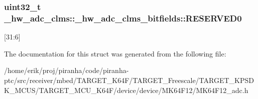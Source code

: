 \subsubsection[{\texorpdfstring{R\+E\+S\+E\+R\+V\+E\+D0}{RESERVED0}}]{\setlength{\rightskip}{0pt plus 5cm}uint32\+\_\+t \+\_\+hw\+\_\+adc\+\_\+clms\+::\+\_\+hw\+\_\+adc\+\_\+clms\+\_\+bitfields\+::\+R\+E\+S\+E\+R\+V\+E\+D0}\hypertarget{struct__hw__adc__clms_1_1__hw__adc__clms__bitfields_a57bd858771503ebb39e9ba968a82676d}{}\label{struct__hw__adc__clms_1_1__hw__adc__clms__bitfields_a57bd858771503ebb39e9ba968a82676d}
\mbox{[}31\+:6\mbox{]} 

The documentation for this struct was generated from the following file\+:\begin{DoxyCompactItemize}
\item 
/home/erik/proj/piranha/code/piranha-\/ptc/src/receiver/mbed/\+T\+A\+R\+G\+E\+T\+\_\+\+K64\+F/\+T\+A\+R\+G\+E\+T\+\_\+\+Freescale/\+T\+A\+R\+G\+E\+T\+\_\+\+K\+P\+S\+D\+K\+\_\+\+M\+C\+U\+S/\+T\+A\+R\+G\+E\+T\+\_\+\+M\+C\+U\+\_\+\+K64\+F/device/device/\+M\+K64\+F12/M\+K64\+F12\+\_\+adc.\+h\end{DoxyCompactItemize}

